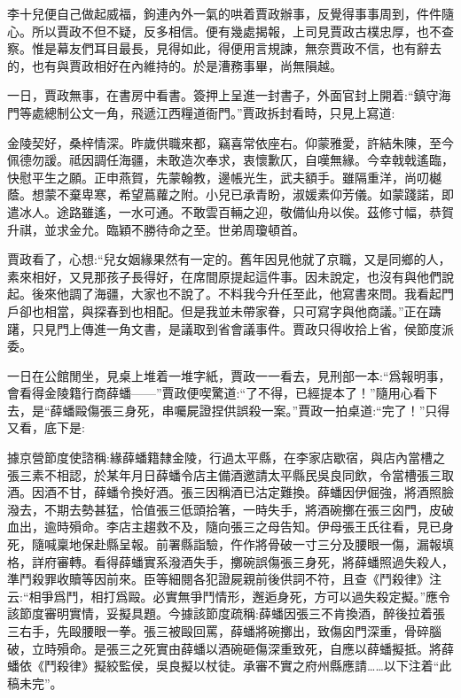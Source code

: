 \begin{parag}
    李十兒便自己做起威福，鉤連內外一氣的哄着賈政辦事，反覺得事事周到，件件隨心。所以賈政不但不疑，反多相信。便有幾處揭報，上司見賈政古樸忠厚，也不查察。惟是幕友們耳目最長，見得如此，得便用言規諫，無奈賈政不信，也有辭去的，也有與賈政相好在內維持的。於是漕務事畢，尚無隕越。
\end{parag}


\begin{parag}
    一日，賈政無事，在書房中看書。簽押上呈進一封書子，外面官封上開着:“鎮守海門等處總制公文一角，飛遞江西糧道衙門。”賈政拆封看時，只見上寫道:
\end{parag}


\begin{qute2sp}
    金陵契好，桑梓情深。昨歲供職來都，竊喜常依座右。仰蒙雅愛，許結朱陳，至今佩德勿諼。祗因調任海疆，未敢造次奉求，衷懷歉仄，自嘆無緣。今幸戟戟遙臨，快慰平生之願。正申燕賀，先蒙翰教，邊帳光生，武夫額手。雖隔重洋，尚叨樾蔭。想蒙不棄卑寒，希望蔦蘿之附。小兒已承青盼，淑媛素仰芳儀。如蒙踐諾，即遣冰人。途路雖遙，一水可通。不敢雲百輛之迎，敬備仙舟以俟。茲修寸幅，恭賀升祺，並求金允。臨穎不勝待命之至。世弟周瓊頓首。
\end{qute2sp}


\begin{parag}
    賈政看了，心想:“兒女姻緣果然有一定的。舊年因見他就了京職，又是同鄉的人，素來相好，又見那孩子長得好，在席間原提起這件事。因未說定，也沒有與他們說起。後來他調了海疆，大家也不說了。不料我今升任至此，他寫書來問。我看起門戶卻也相當，與探春到也相配。但是我並未帶家眷，只可寫字與他商議。”正在躊躇，只見門上傳進一角文書，是議取到省會議事件。賈政只得收拾上省，侯節度派委。
\end{parag}


\begin{parag}
    一日在公館閒坐，見桌上堆着一堆字紙，賈政一一看去，見刑部一本:“爲報明事，會看得金陵籍行商薛蟠——”賈政便喫驚道:“了不得，已經提本了！”隨用心看下去，是“薛蟠毆傷張三身死，串囑屍證捏供誤殺一案。”賈政一拍桌道:“完了！”只得又看，底下是:
\end{parag}


\begin{qute2sp}
    據京營節度使諮稱:緣薛蟠籍隸金陵，行過太平縣，在李家店歇宿，與店內當槽之張三素不相認，於某年月日薛蟠令店主備酒邀請太平縣民吳良同飲，令當槽張三取酒。因酒不甘，薛蟠令換好酒。張三因稱酒已沽定難換。薛蟠因伊倔強，將酒照臉潑去，不期去勢甚猛，恰值張三低頭拾箸，一時失手，將酒碗擲在張三囟門，皮破血出，逾時殞命。李店主趨救不及，隨向張三之母告知。伊母張王氏往看，見已身死，隨喊稟地保赴縣呈報。前署縣詣驗，仵作將骨破一寸三分及腰眼一傷，漏報填格，詳府審轉。看得薛蟠實系潑酒失手，擲碗誤傷張三身死，將薛蟠照過失殺人，準鬥殺罪收贖等因前來。臣等細閱各犯證屍親前後供詞不符，且查《鬥殺律》注云:“相爭爲鬥，相打爲毆。必實無爭鬥情形，邂逅身死，方可以過失殺定擬。”應令該節度審明實情，妥擬具題。今據該節度疏稱:薛蟠因張三不肯換酒，醉後拉着張三右手，先毆腰眼一拳。張三被毆回罵，薛蟠將碗擲出，致傷囟門深重，骨碎腦破，立時殞命。是張三之死實由薛蟠以酒碗砸傷深重致死，自應以薛蟠擬抵。將薛蟠依《鬥殺律》擬絞監侯，吳良擬以杖徒。承審不實之府州縣應請……以下注着“此稿未完”。
\end{qute2sp}


